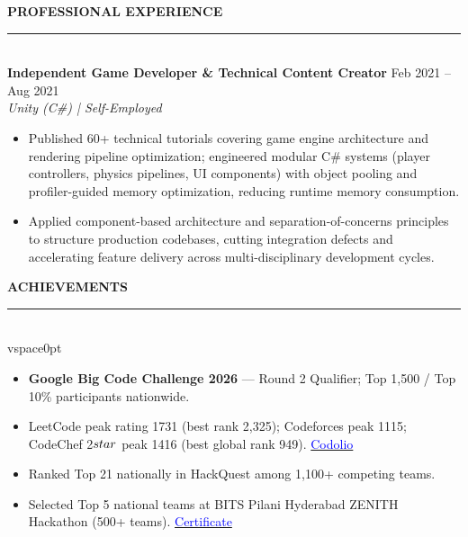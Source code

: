\documentclass[10pt,letterpaper]{article}
\begin{document}
\vspace{2pt}

\noindent\textbf{PROFESSIONAL EXPERIENCE}\\[-5pt]
\rule{\textwidth}{0.4pt}\\[1pt]
\textbf{Independent Game Developer \& Technical Content Creator} \hfill Feb 2021 -- Aug 2021\\
\textit{Unity (C\#) | Self-Employed}
\begin{itemize}[leftmargin=10pt,itemsep=0pt,parsep=0pt,topsep=0pt]
    \item Published 60+ technical tutorials covering game engine architecture and rendering pipeline optimization; engineered modular C\# systems (player controllers, physics pipelines, UI components) with object pooling and profiler-guided memory optimization, reducing runtime memory consumption.
    \item Applied component-based architecture and separation-of-concerns principles to structure production codebases, cutting integration defects and accelerating feature delivery across multi-disciplinary development cycles.
\end{itemize}

\vspace{2pt}

\noindent\textbf{ACHIEVEMENTS}\\[-5pt]
\rule{\textwidth}{0.4pt}\\vspace{0pt}
\begin{itemize}[leftmargin=10pt,itemsep=0pt,parsep=0pt,topsep=0pt]
    \item \textbf{Google Big Code Challenge 2026} --- Round 2 Qualifier; Top 1,500 / Top 10\% participants nationwide.
    \item LeetCode peak rating 1731 (best rank 2,325); Codeforces peak 1115; CodeChef 2$\\star$ peak 1416 (best global rank 949). \hfill \href{https://codolio.com/profile/lukeshpoddar}{\textcolor{blue}{Codolio}}
    \item Ranked Top 21 nationally in HackQuest among 1,100+ competing teams.
    \item Selected Top 5 national teams at BITS Pilani Hyderabad ZENITH Hackathon (500+ teams). \hfill \href{https://drive.google.com/file/d/1_GfcnI6srXznkRCc2NSSOo1lWpnOnI8M/view?usp=sharing}{\textcolor{blue}{Certificate}}
\end{itemize}

\vspace{2pt}
\end{document}
